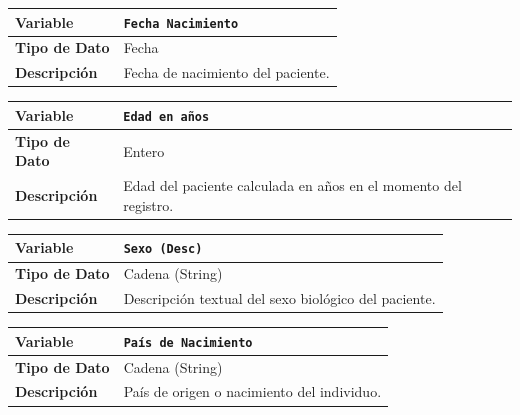 \documentclass[12pt,a4paper,onecolumn,oneside]{report}
\begin{document}
\noindent
\begin{tabular}{|p{3.5cm}|p{10.5cm}|}
\hline
\rowcolor[RGB]{239,239,239} 
\textbf{Variable} & \textbf{\texttt{Fecha Nacimiento}} \\ \hline
\textbf{Tipo de Dato} & Fecha \\ \hline
\textbf{Descripción} & Fecha de nacimiento del paciente. \\ \hline
\end{tabular}
\label{tab:var_fecha_nacimiento}
\vspace{0.4cm}

\noindent
\begin{tabular}{|p{3.5cm}|p{10.5cm}|}
\hline
\rowcolor[RGB]{239,239,239} 
\textbf{Variable} & \textbf{\texttt{Edad en años}} \\ \hline
\textbf{Tipo de Dato} & Entero \\ \hline
\textbf{Descripción} & Edad del paciente calculada en años en el momento del registro. \\ \hline
\end{tabular}
\label{tab:var_edad}
\vspace{0.4cm}

\noindent
\begin{tabular}{|p{3.5cm}|p{10.5cm}|}
\hline
\rowcolor[RGB]{239,239,239} 
\textbf{Variable} & \textbf{\texttt{Sexo (Desc)}} \\ \hline
\textbf{Tipo de Dato} & Cadena (String) \\ \hline
\textbf{Descripción} & Descripción textual del sexo biológico del paciente. \\ \hline
\end{tabular}
\label{tab:var_sexo}
\vspace{0.4cm}

\noindent
\begin{tabular}{|p{3.5cm}|p{10.5cm}|}
\hline
\rowcolor[RGB]{239,239,239} 
\textbf{Variable} & \textbf{\texttt{País de Nacimiento}} \\ \hline
\textbf{Tipo de Dato} & Cadena (String) \\ \hline
\textbf{Descripción} & País de origen o nacimiento del individuo. \\ \hline
\end{tabular}
\label{tab:var_pais_nacimiento}
\vspace{0.4cm}
\end{document}

